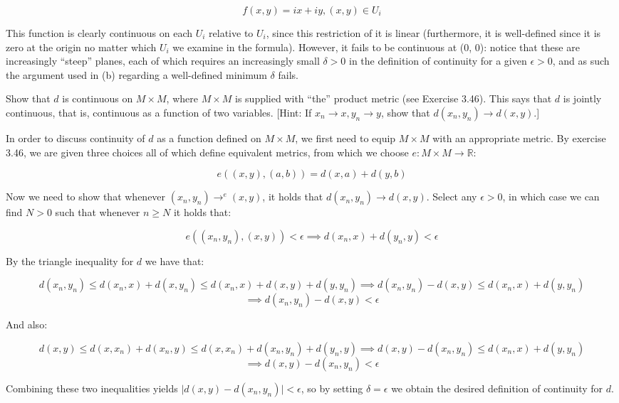 \begin{solution}
    \[f(x, y) =  i x + i y, (x, y) \in U_i\]

    This function is clearly continuous on each $U_i$ relative to $U_i$, since this restriction of it is linear (furthermore, it is well-defined since it is zero at the origin no matter which $U_i$ we examine in the formula).
    However, it fails to be continuous at (0, 0): notice that these are increasingly ``steep'' planes, each of which requires an increasingly small $\delta > 0$ in the definition of continuity for a given $\epsilon > 0$, and as such the argument used in (b) regarding a well-defined minimum $\delta$ fails.
\end{solution}

\begin{exercise}{34}
    Show that $d$ is continuous on $M \times M$, where $M \times M$ is supplied with ``the'' product metric (see Exercise 3.46).
    This says that $d$ is jointly continuous, that is, continuous as a function of two variables.
    [Hint: If $x_n \rightarrow x, y_n \rightarrow y$, show that $d(x_n, y_n) \rightarrow d(x, y)$.]
\end{exercise}

\begin{solution}

    In order to discuss continuity of $d$ as a function defined on $M \times M$, we first need to equip $M \times M$ with an appropriate metric.
    By exercise 3.46, we are given three choices all of which define equivalent metrics, from which we choose $e: M \times M \rightarrow \mathbb{R}$:

    \[e((x, y), (a, b)) = d(x, a) + d(y, b)\]

    Now we need to show that whenever $(x_n, y_n) \rightarrow^{e} (x, y)$, it holds that $d(x_n, y_n) \rightarrow d(x, y)$.
    Select any $\epsilon > 0$, in which case we can find $N > 0$ such that whenever $n \geq N$ it holds that:

    \[e((x_n, y_n), (x, y)) < \epsilon \implies d(x_n, x) + d(y_n, y) < \epsilon\]
    
    By the triangle inequality for $d$ we have that:

    \[d(x_n, y_n) \leq d(x_n, x) + d(x, y_n) \leq d(x_n, x) + d(x, y) + d(y, y_n) \implies d(x_n, y_n) - d(x, y) \leq d(x_n, x) + d(y, y_n)\]
    \[\implies d(x_n, y_n) - d(x, y) < \epsilon\]

    And also:

    \[d(x, y) \leq d(x, x_n) + d(x_n, y) \leq d(x, x_n) + d(x_n, y_n) + d(y_n, y) \implies d(x, y) - d(x_n, y_n) \leq d(x_n, x) + d(y, y_n)\]
    \[\implies d(x, y) - d(x_n, y_n) < \epsilon\] 
    
    Combining these two inequalities yields $\lvert d(x, y) - d(x_n, y_n) \rvert < \epsilon$, so by setting $\delta = \epsilon$ we obtain the desired definition of continuity for $d$.
\end{solution}

